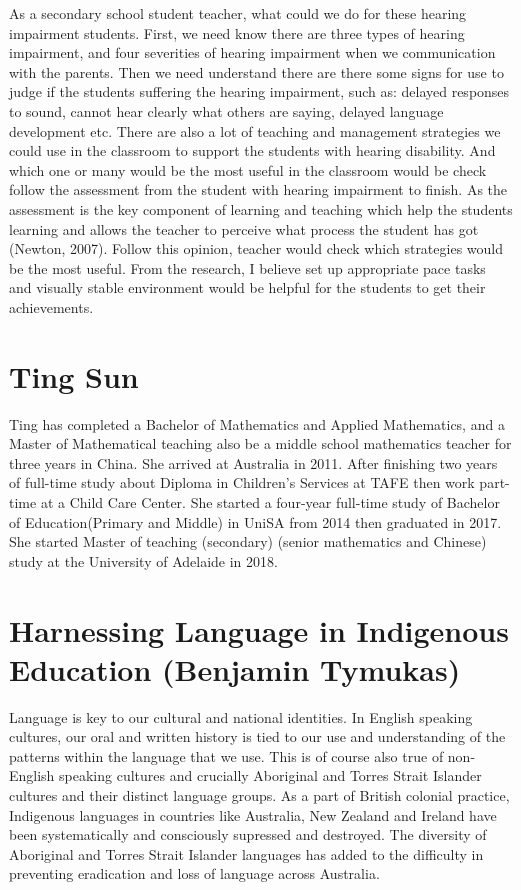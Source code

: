 \documentclass[twoside,14pt,a4paper,notitlepage]{memoir}
\begin{document}
As a secondary school student teacher, what could we do for these hearing impairment students. First, we need know there are three types of hearing impairment, and four severities of hearing impairment when we communication with the parents. Then we need understand there are there some signs for use to judge if the students suffering the hearing impairment, such as: delayed responses to sound, cannot hear clearly what others are saying, delayed language development etc. There are also a lot of teaching and management strategies we could use in the classroom to support the students with hearing disability. And which one or many would be the most useful in the classroom would be check follow the assessment from the student with hearing impairment to finish. As the assessment is the key component of learning and teaching which help the students learning and allows the teacher to perceive what process the student has got (Newton, 2007). Follow this opinion, teacher would check which strategies would be the most useful. From the research, I believe set up appropriate pace tasks and visually stable environment would be helpful for the students to get their achievements.

\section*{Ting Sun}

Ting has completed a Bachelor of Mathematics and Applied Mathematics, and a Master of Mathematical teaching also be a middle school mathematics teacher for three years in China. She arrived at Australia in 2011. After finishing two years of full-time study about Diploma in Children’s Services at TAFE then work part-time at a Child Care Center. She started a four-year full-time study of Bachelor of Education(Primary and Middle) in UniSA from 2014 then graduated in 2017. She started Master of teaching (secondary) (senior mathematics and Chinese) study at the University of Adelaide in 2018. 



\section*{Harnessing Language in Indigenous Education (Benjamin Tymukas)}
\label{aut:tymukas}

Language is key to our cultural and national identities. In English speaking cultures, our oral and written history is tied to our use and understanding of the patterns within the language that we use. This is of course also true of non-English speaking cultures and crucially Aboriginal and Torres Strait Islander cultures and their distinct language groups. As a part of British colonial practice, Indigenous languages in countries like Australia, New Zealand and Ireland have been systematically and consciously supressed and destroyed. The diversity of Aboriginal and Torres Strait Islander languages has added to the difficulty in preventing eradication and loss of language across Australia.
 
\end{document}
